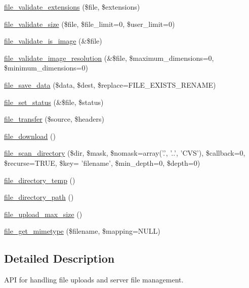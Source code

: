 \begin{CompactItemize}
\item 
\hyperlink{group__file_g7f9c8080c156bba75bf4ad9812378a2c}{file\_\-validate\_\-extensions} (\$file, \$extensions)
\item 
\hyperlink{group__file_g69120c7a4e953069673539c6710575f4}{file\_\-validate\_\-size} (\$file, \$file\_\-limit=0, \$user\_\-limit=0)
\item 
\hyperlink{group__file_gbabb21f40d60d2cbd21953d0935abdb7}{file\_\-validate\_\-is\_\-image} (\&\$file)
\item 
\hyperlink{group__file_gb6e58a5341acf0be4c030887836f75f6}{file\_\-validate\_\-image\_\-resolution} (\&\$file, \$maximum\_\-dimensions=0, \$minimum\_\-dimensions=0)
\item 
\hyperlink{group__file_g0c3dd2f6c8734744740fd1f00f84c719}{file\_\-save\_\-data} (\$data, \$dest, \$replace=FILE\_\-EXISTS\_\-RENAME)
\item 
\hyperlink{group__file_g68a0e6728e47cf2f9d543a0002ff3f49}{file\_\-set\_\-status} (\&\$file, \$status)
\item 
\hyperlink{group__file_g33925d82d6b6057e73ae7853f1be7125}{file\_\-transfer} (\$source, \$headers)
\item 
\hyperlink{group__file_g91226299fab7e95a673f6461bbc19b02}{file\_\-download} ()
\item 
\hyperlink{group__file_g374c73d3fe4f45c2d64a5fb0b22cb118}{file\_\-scan\_\-directory} (\$dir, \$mask, \$nomask=array('.', '..', 'CVS'), \$callback=0, \$recurse=TRUE, \$key= 'filename', \$min\_\-depth=0, \$depth=0)
\item 
\hyperlink{group__file_g250e5cfba54030ab1e5f031608860e42}{file\_\-directory\_\-temp} ()
\item 
\hyperlink{group__file_gd516f499a62a2e22f95f4969262cd617}{file\_\-directory\_\-path} ()
\item 
\hyperlink{group__file_g7cf25e6a2532a1d022ee1c655f895380}{file\_\-upload\_\-max\_\-size} ()
\item 
\hyperlink{group__file_g27868c5159f7f001457c284123fe9311}{file\_\-get\_\-mimetype} (\$filename, \$mapping=NULL)
\end{CompactItemize}


\subsection{Detailed Description}
API for handling file uploads and server file management. 